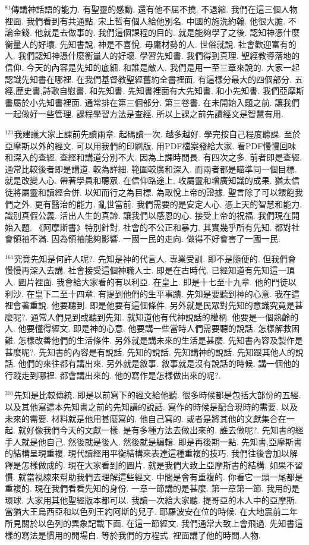 \documentclass{book}
\begin{document}
$^{81}$傳講神話語的能力.
有聖靈的感動.
還有他不屈不撓.
不退縮.
我們在這三個人物裡面.
我們看到有共通點.
宋上哲有個人給他別名.
中國的施洗約翰.
他很大膽.
不論金錢.
他就是去做事的.
我們這個課程的目的.
就是能夠學了之後.
認知神憑什麼衡量人的好壞.
先知書說.
神是不喜悅.
毋庸材勢的人.
世俗就說.
社會歡迎富有的人.
我們認知神憑什麼衡量人的好壞.
學習先知書.
我們得到真理.
聖經教導落地的信仰.
今天的內容是先知的底細.
和誰是敵人.
我們是用一至三章來說的.
大家一起認識先知書在哪裡.
在我們基督教聖經舊約全書裡面.
有這樣分最大的四個部分.
五經,歷史書,詩歌自慰書.
和先知書.
先知書裡面有大先知書.
和小先知書.
我們亞摩斯書屬於小先知書裡面.
通常排在第三個部分.
第三卷書.
在未開始入題之前.
讓我們一起做好一些管理.
課程學習方法是查經.
所以上課之前先讀經文是智慧有用.

$^{121}$我建議大家上課前先讀兩章.
起碼讀一次.
越多越好.
學完按自己程度聽課.
至於亞摩斯以外的經文.
可以用我們的印刷版.
用PDF檔案發給大家.
看PDF慢慢回味和深入的查經.
查經和講道分別不大.
因為上課時間長.
有四次之多.
前者即是查經.
通常比較後者即是講道.
較為詳細.
範圍較廣和深入.
而兩者都是瞄準同一個目標.
就是改變人心.
帶著學員和聽眾.
在信仰路途上.
收屬靈和增廣知識的成果.
猶太信徒將屬靈和讀經合併.
以知而行之為目標.
為取悅上帝的證據.
聖言除了可以餵飽我們之外.
更有醫治的能力.
亂世當前.
我們需要的是安定人心.
憑上天的智慧和能力.
識別真假公義.
活出人生的真諦.
讓我們以感恩的心.
接受上帝的祝福.
我們現在開始入題.
《阿摩斯書》特別針對.
社會的不公正和暴力.
其實幾乎所有先知.
都對社會領袖不滿.
因為領袖能夠影響.
一國一民的走向.
做得不好會害了一國一民.

$^{161}$究竟先知是何許人呢?.
先知是神的代言人.
專業受訓.
即不是隨便的.
但我們會慢慢再深入去講.
社會接受這個神職人士.
即是在古時代.
已經知道有先知這一頂人.
圖片裡面.
我會給大家看的有以利亞.
在皇上.
即是十七至十九章.
他的門徒以利沙.
在皇下二至十四章.
有提到他們的生平事蹟.
先知是要聽到神的心意.
我在這裡會著重說.
他要聽到.
即是他要有這個條件.
另外就是民眾對先知的意識究竟是甚麼呢?.
通常人們見到或聽到先知.
就知道他有代神說話的權柄.
他要是一個熟齡的人.
他要懂得經文.
即是神的心意.
他要講一些當時人們需要聽的說話.
怎樣解救困難.
怎樣改善他們的生活條件.
另外就是講未來的生活是甚麼.
先知書內容及製作是甚麼呢?.
先知書的內容是有說話.
先知的說話.
先知講神的說話.
先知跟其他人的說話.
他們的來往都有講出來.
另外就是敘事.
敘事就是沒有說話的時候.
講一個他的行蹤走到哪裡.
都會講出來的.
他的寫作是怎樣做出來的呢?.

$^{201}$先知是比較傳統.
即是以前寫下的經文給他聽.
很多時候都是包括大部份的五經.
以及其他寫這本先知書之前的先知講的說話.
寫作的時候是配合現時的需要.
以及未來的需要.
材料就是他用甚麼寫的.
他自己寫的.
或者是將其他的文獻集合在一起.
就好像我們今天的文獻一樣.
是有多種方法去做出來的.
誰去做呢?.
先知書的經手人就是他自己.
然後就是後人.
然後就是編輯.
即是再後期一點.
先知書,亞摩斯書的結構呈現重複.
現代讀經用平衡結構來表達這種重複的技巧.
我們往後會加以解釋是怎樣做成的.
現在大家看到的圖片.
就是我們大致上亞摩斯書的結構.
如果不習慣.
就當視線來幫助我們去理解這些經文.
中間是會有重複的.
你看它一頭一尾都是重複的.
現在我們看看先知的身份.
一章一節講的是甚麼.
第一章第一節.
我用的是環球.
大家用其他聖經版本都可以.
我讀一次給大家聽.
提哥亞的木人中的亞摩斯.
當猶大王烏西亞和以色列王約阿斯的兒子.
耶羅波安在位的時候.
在大地震前二年所見關於以色列的異象記載下面.
在這一節經文.
我們通常大致上會飛過.
先知書這樣的寫法是慣用的開場白.
等於我們的方程式.
裡面講了他的時間,人物.
\end{document}
